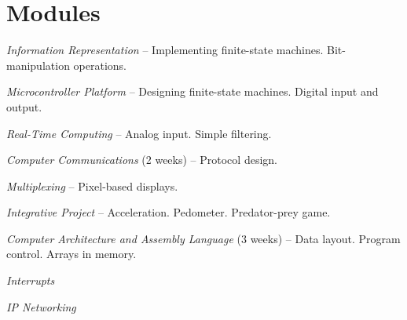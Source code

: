 \section{Modules}
\label{sec:weeks}


\emph{Information Representation} -- Implementing finite-state machines.
Bit-manipulation operations.

\emph{Microcontroller Platform} -- Designing finite-state machines.
Digital input and output.

\emph{Real-Time Computing} -- Analog input. Simple filtering.

\emph{Computer Communications} (2 weeks) -- Protocol design.

\emph{Multiplexing} -- Pixel-based displays.

\emph{Integrative Project} -- Acceleration. Pedometer. Predator-prey game.

\emph{Computer Architecture and Assembly Language} (3 weeks) -- Data layout.
Program control. Arrays in memory.


\emph{Interrupts}

\emph{IP Networking}
